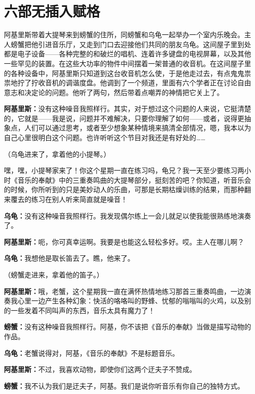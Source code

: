 \documentclass[
  12pt,
  twoside,
  openright,
  oldfontcommands,
]{memoir}
\newcommand{\dialogname}[1]{{\sffamily\bfseries #1}}
\begin{document}
\mainmatter
\setcounter{chapter}{48}
\markboth{}{}

\chapter{六部无插入赋格}

阿基里斯带着大提琴来到螃蟹的住所，同螃蟹和乌龟一起举办一个室内乐晚会。主人螃蟹把他引进音乐厅，又走到门口去迎接他们共同的朋友乌龟。这间屋子里到处都是电子设备------各种完整的和破烂的唱机、连着许多键盘的电视屏幕，以及其他一些罕见的装置。在这些大功率的物件中间摆着一架普通的收音机。在这间屋子里的各种设备中，阿基里斯只知道到这台收音机怎么使，于是他走过去，有点鬼鬼祟祟地拧了拧收音机的调谐度盘。他调到了一个频道，里面有六个学者正在讨论自由意志和决定论的问题。他听了两句，然后带着点嘲弄的神情把它关上了。

\dialogname{阿基里斯：}没有这种噪音我照样行。其实，对于想过这个问题的人来说，它挺清楚的，它就是------我是说，问题并不难解决，只要你理解了如何------或者，说得更抽象点，人们可以通过思考，或者至少想象某种情境来搞清全部情况，嗯，我本以为自己心里很明白这个问题。也许听听这个节目对我还是有好处的\ldots\ldots{}

（乌龟进来了，拿着他的小提琴。）

嘿，嘿，小提琴家来了！你这个星期一直在练习吗，龟兄？我一天至少要练习两小时《音乐的奉献》中的三重奏鸣曲的大提琴部分，挺刻苦的吧？你知道，听音乐会的时候，你所听到的只是美妙动人的乐曲，可那是长期枯燥训练的结果，而那种翻来覆去的练习在别人听来简直就是噪音！

\dialogname{乌龟：}没有这种噪音我照样行。我发现偶尔练上一会儿就足以使我能很熟练地演奏了。

\dialogname{阿基里斯：}呃，你可真幸运啊。我要是也能这么轻松多好。哎。主人在哪儿啊？

\dialogname{乌龟：}我想他是取长笛去了。瞧，他来了。

（螃蟹走进来，拿着他的笛子。）

\dialogname{阿基里斯：}哦，老蟹，这个星期我一直在满怀热情地练习那首三重奏鸣曲，一边演奏我心里一边产生各种幻象：快活的咯咯叫的野蜂、忧郁的嗡嗡叫的火鸡，以及别的一些发着不同叫声的东西，音乐太具有魔力了！

\dialogname{螃蟹：}没有这种噪音我照样行。阿基，你不该把《音乐的奉献》当做是描写动物的作品。

\dialogname{乌龟：}老蟹说得对，阿基，《音乐的奉献》不是标题音乐。

\dialogname{阿基里斯：}不过，我喜欢动物，即使你们这两个迂夫子不赞成。

\dialogname{螃蟹：}我不认为我们是迂夫子，阿基。我们是说你听音乐有你自己的独特方式。
\end{document}
